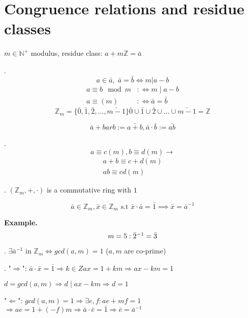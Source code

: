 \section{Congruence relations and residue classes}

\begin{definition}
$m \in \mathbb{N}^{+}$ modulus, 
residue class: $a+m \mathbb{Z} = \bar{a}$ 
\end{definition}

\Remark.
\[
  a\in \bar{a},\; \bar{a} = \bar{b} \iff m | a-b
\]
\begin{align*}
  a \equiv b \mod m & :\iff m \mid a-b \\
  a \equiv (m)     & :\iff \bar{a} = \bar{b}
\end{align*}
\[
  \mathbb{Z}_m = \{ \bar{0},\bar{1},\bar{2}, \ldots, \bar{m-1}\} 
  \bar{0} \cup \bar{1} \cup \bar{2} \cup  \ldots \cup \bar{m-1} = \mathbb{Z}
\]


\begin{definition}
\[
  \bar{a} + bar{b} := \bar{a+b}, \bar{a} \cdot \bar{b} := \bar{ab}
\]
\end{definition}

\Remark.
\[
  a \equiv c(m), b \equiv d(m) \rightarrow 
\]
\begin{align*}
  a+b \equiv c+d(m) \\
  ab \equiv cd (m)
\end{align*}

\Theorem.
$(\mathbb{Z}_m, + , \cdot)$ is a commutative ring with $1$

\begin{definition}
\[
  \bar{a} \in \mathbb{Z}_m, \bar{x} \in \mathbb{Z}_m \text{ s.t }
  \bar{x} \cdot \bar{a} = \bar{1} \implies \bar{x} = \bar{a}^{-1}
\]
\end{definition}

\textbf{Example.}
\[
  m = 5: \bar{2}^{-1} = \bar{3} \\
\]

\Theorem.
$\exists \bar{a}^{-1} \text{ in } \mathbb{Z}_m \iff gcd(a,m) = 1$ ($a,m$ are co-prime)

\Proof.
"$\Rightarrow$": 
  $\bar{a}\cdot \bar{x} = \bar{1} \Rightarrow k\in Z 
  ax = 1 + km \Rightarrow ax - km = 1$

  $d = gcd(a,m) \Rightarrow d \mid ax - km \Rightarrow d = 1$

"$\Leftarrow$":
  $gcd(a,m) = 1 \Rightarrow \exists e,f : ae + mf = 1$ \\
  $\Rightarrow ae = 1 + (-f)m \Rightarrow \bar{a} \cdot \bar{e} = \bar{1} \Rightarrow \bar{e} = \bar{a}^{-1}$

